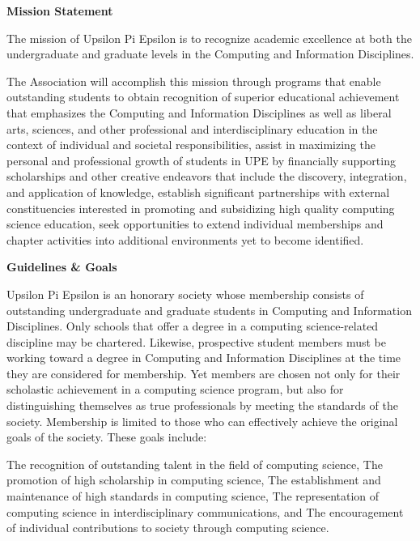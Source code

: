 \documentclass{article}
\begin{document}
\setlength{\columnsep}{2cm}

\begin{multicols}{2}

\small{
\begin{center}\textbf{Mission Statement}\end{center}

The mission of Upsilon Pi Epsilon is to recognize academic excellence at both the undergraduate and graduate levels in the Computing and Information Disciplines.

The Association will accomplish this mission through programs that enable outstanding students to obtain recognition of superior educational achievement that emphasizes the Computing and Information Disciplines as well as liberal arts, sciences, and other professional and interdisciplinary education in the context of individual and societal responsibilities, assist in maximizing the personal and professional growth of students in UPE by financially supporting scholarships and other creative endeavors that include the discovery, integration, and application of knowledge, establish significant partnerships with external constituencies interested in promoting and subsidizing high quality computing science education,
seek opportunities to extend individual memberships and chapter activities into additional environments yet to become identified.

\begin{center}\textbf{Guidelines \& Goals}\end{center}

Upsilon Pi Epsilon is an honorary society whose membership consists of outstanding undergraduate and graduate students in Computing and Information Disciplines. Only schools that offer a degree in a computing science-related discipline may be chartered. Likewise, prospective student members must be working toward a degree in Computing and Information Disciplines at the time they are considered for membership. Yet members are chosen not only for their scholastic achievement in a computing science program, but also for distinguishing themselves as true professionals by meeting the standards of the society. Membership is limited to those who can effectively achieve the original goals of the society. These goals include:

    The recognition of outstanding talent in the field of computing science,
    The promotion of high scholarship in computing science,
    The establishment and maintenance of high standards in computing science,
    The representation of computing science in interdisciplinary communications, and
    The encouragement of individual contributions to society through computing science.

}
\end{multicols}
\end{document}
